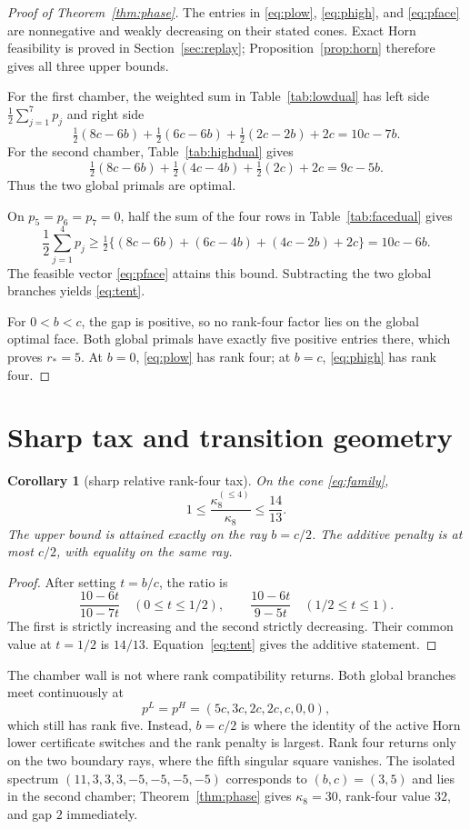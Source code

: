 \documentclass[11pt]{article}
\newtheorem{corollary}[theorem]{Corollary}
\begin{document}
\begin{proof}[Proof of Theorem~\ref{thm:phase}]
The entries in \eqref{eq:plow}, \eqref{eq:phigh}, and \eqref{eq:pface}
are nonnegative and weakly decreasing on their stated cones.  Exact Horn
feasibility is proved in Section~\ref{sec:replay}; Proposition~\ref{prop:horn}
therefore gives all three upper bounds.

For the first chamber, the weighted sum in Table~\ref{tab:lowdual} has left
side $\frac12\sum_{j=1}^7p_j$ and right side
\[
 \tfrac12(8c-6b)+\tfrac12(6c-6b)+\tfrac12(2c-2b)+2c
 =10c-7b.
\]
For the second chamber, Table~\ref{tab:highdual} gives
\[
 \tfrac12(8c-6b)+\tfrac12(4c-4b)+\tfrac12(2c)+2c
 =9c-5b.
\]
Thus the two global primals are optimal.

On $p_5=p_6=p_7=0$, half the sum of the four rows in
Table~\ref{tab:facedual} gives
\[
 \frac12\sum_{j=1}^4p_j\ge
 \tfrac12\{(8c-6b)+(6c-4b)+(4c-2b)+2c\}=10c-6b.
\]
The feasible vector \eqref{eq:pface} attains this bound.  Subtracting the two
global branches yields \eqref{eq:tent}.

For $0<b<c$, the gap is positive, so no rank-four factor lies on the global
optimal face.  Both global primals have exactly five positive entries there,
which proves $r_*=5$.  At $b=0$, \eqref{eq:plow} has rank four; at $b=c$,
\eqref{eq:phigh} has rank four.
\end{proof}

\section{Sharp tax and transition geometry}

\begin{corollary}[sharp relative rank-four tax]\label{cor:tax}
On the cone \eqref{eq:family},
\[
 1\le \frac{\kappa_8^{(\le4)}}{\kappa_8}\le\frac{14}{13}.
\]
The upper bound is attained exactly on the ray $b=c/2$.  The additive penalty
is at most $c/2$, with equality on the same ray.
\end{corollary}

\begin{proof}
After setting $t=b/c$, the ratio is
\[
 \frac{10-6t}{10-7t}\quad(0\le t\le1/2),\qquad
 \frac{10-6t}{9-5t}\quad(1/2\le t\le1).
\]
The first is strictly increasing and the second strictly decreasing.  Their
common value at $t=1/2$ is $14/13$.  Equation~\eqref{eq:tent} gives the
additive statement.
\end{proof}

The chamber wall is not where rank compatibility returns.  Both global
branches meet continuously at
\[
 p^L=p^H=(5c,3c,2c,2c,c,0,0),
\]
which still has rank five.  Instead, $b=c/2$ is where the identity of the
active Horn lower certificate switches and the rank penalty is largest.  Rank
four returns only on the two boundary rays, where the fifth singular square
vanishes.  The isolated spectrum $(11,3,3,3,-5,-5,-5,-5)$ corresponds to
$(b,c)=(3,5)$ and lies in the second chamber; Theorem~\ref{thm:phase} gives
$\kappa_8=30$, rank-four value $32$, and gap $2$ immediately.
\end{document}
